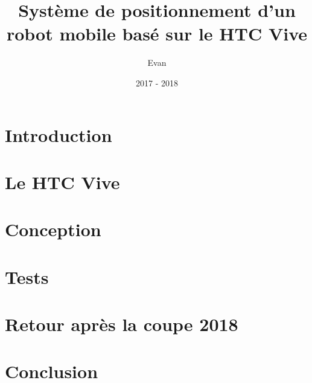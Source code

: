 \documentclass[10pt,a4paper]{report}
\title{Système de positionnement d'un robot mobile basé sur le HTC Vive}
\author{Evan \bsc{Roué}}
\date{2017 - 2018}
\begin{document}
\maketitle



\tableofcontents
\thispagestyle{empty}
\setcounter{page}{0}



\chapter{Introduction}
\chapter{Le HTC Vive}
\chapter{Conception}
\chapter{Tests}
\chapter{Retour après la coupe 2018}
\chapter{Conclusion}
\end{document}
